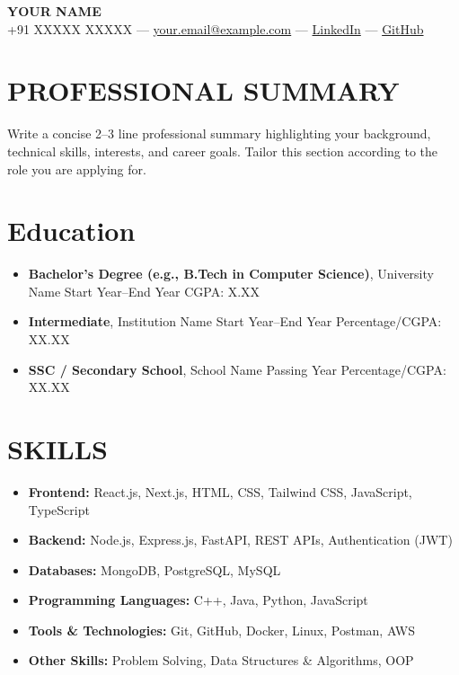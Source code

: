 \documentclass[10pt,a4paper]{article}
\begin{document}
\begin{center}
{\LARGE \textbf{YOUR NAME}} \\[4pt]

+91 XXXXX XXXXX ---
\href{mailto:your.email@example.com}{your.email@example.com}
---
\href{https://www.linkedin.com/in/your-linkedin}{LinkedIn}
---
\href{https://github.com/your-github}{GitHub}
\end{center}

\section*{PROFESSIONAL SUMMARY}

Write a concise 2--3 line professional summary highlighting your background, technical skills, interests, and career goals. Tailor this section according to the role you are applying for.

\section*{Education}
\begin{itemize}[leftmargin=0.15in, itemsep=2pt]
    \item \textbf{Bachelor's Degree (e.g., B.Tech in Computer Science)}, University Name \hfill Start Year--End Year \quad CGPA: X.XX
    \item \textbf{Intermediate}, Institution Name \hfill Start Year--End Year \quad Percentage/CGPA: XX.XX
    \item \textbf{SSC / Secondary School}, School Name \hfill Passing Year \quad Percentage/CGPA: XX.XX
\end{itemize}

\section*{SKILLS}

\begin{itemize}[leftmargin=0.15in,label={},itemsep=2pt]

\item \textbf{Frontend:} React.js, Next.js, HTML, CSS, Tailwind CSS, JavaScript, TypeScript

\item \textbf{Backend:} Node.js, Express.js, FastAPI, REST APIs, Authentication (JWT)

\item \textbf{Databases:} MongoDB, PostgreSQL, MySQL

\item \textbf{Programming Languages:} C++, Java, Python, JavaScript

\item \textbf{Tools \& Technologies:} Git, GitHub, Docker, Linux, Postman, AWS

\item \textbf{Other Skills:} Problem Solving, Data Structures \& Algorithms, OOP

\end{itemize}
\end{document}
